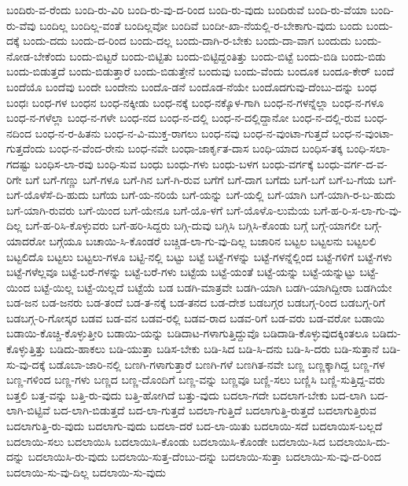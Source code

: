 ಬಂದಿರು-ವ-ರೆಂದು
ಬಂದಿ-ರು-ವಿರಿ
ಬಂದಿ-ರು-ವು-ದ-ರಿಂದ
ಬಂದಿ-ರು-ವುದು
ಬಂದಿರುವೆ
ಬಂದಿ-ರು-ವೆಯಾ
ಬಂದಿ-ರು-ವೆವು
ಬಂದಿಲ್ಲ
ಬಂದಿಲ್ಲ-ವಂತೆ
ಬಂದಿಲ್ಲವೋ
ಬಂದಿವೆ
ಬಂದೀ-ಖಾ-ನೆಯಲ್ಲಿ-ರ-ಬೇಕಾಗು-ವುದು
ಬಂದು
ಬಂದು-ದಕ್ಕೆ
ಬಂದು-ದದು
ಬಂದು-ದ-ರಿಂದ
ಬಂದು-ದಲ್ಲ
ಬಂದು-ದಾಗಿ-ರ-ಬೇಕು
ಬಂದು-ದಾ-ವಾಗ
ಬಂದುದು
ಬಂದು-ನೋಡ-ಬೇಕೆಂದು
ಬಂದು-ಬಿಟ್ಟರೆ
ಬಂದು-ಬಿಟ್ಟಿತು
ಬಂದು-ಬಿಟ್ಟಿದ್ದಂತಿತ್ತು
ಬಂದು-ಬಿಟ್ಟೆ
ಬಂದು-ಬಿಡಿ
ಬಂದು-ಬಿಡು
ಬಂದು-ಬಿಡುತ್ತದೆ
ಬಂದು-ಬಿಡುತ್ತಾರೆ
ಬಂದು-ಬಿಡುತ್ತೇನೆ
ಬಂದುವು
ಬಂದು-ವೆಂದು
ಬಂದೂಕ
ಬಂದೂ-ಕೇರ್
ಬಂದೆ
ಬಂದೆಯೊ
ಬಂದೆವು
ಬಂದೇ
ಬಂದೇನು
ಬಂದೊ-ಡನೆ
ಬಂದೊಡ-ನೆಯೇ
ಬಂದೊದಗುವು-ದೆಂಬು-ದನ್ನು
ಬಂಧ
ಬಂಧಃ
ಬಂಧ-ಗಳ
ಬಂಧನ
ಬಂಧ-ನಕ್ಕೀಡು
ಬಂಧ-ನಕ್ಕೆ
ಬಂಧ-ನಕ್ಕೊಳ-ಗಾಗಿ
ಬಂಧ-ನ-ಗಳನ್ನೆಲ್ಲಾ
ಬಂಧ-ನ-ಗಳೂ
ಬಂಧ-ನ-ಗಳೆಲ್ಲಾ
ಬಂಧ-ನ-ಗಳೇ
ಬಂಧ-ನದ
ಬಂಧ-ನ-ದಲ್ಲಿ
ಬಂಧ-ನ-ದಲ್ಲಿದ್ದಾನೋ
ಬಂಧ-ನ-ದಲ್ಲಿ-ರುವ
ಬಂಧ-ನದಿಂದ
ಬಂಧ-ನ-ರ-ಹಿತನು
ಬಂಧ-ನ-ವಿ-ಮುಕ್ತ-ರಾಗಲು
ಬಂಧ-ನವು
ಬಂಧ-ನ-ವುಂಟಾ-ಗುತ್ತದೆ
ಬಂಧ-ನ-ವುಂಟಾ-ಗುತ್ತದೆಂದು
ಬಂಧ-ನ-ವೆಂದ-ರೇನು
ಬಂಧ-ನವೇ
ಬಂಧಾ-ಜಾರ್ಕೃತ-ದಾಸ
ಬಂಧಿ-ಯಾದ
ಬಂಧಿಸ-ತಕ್ಕ
ಬಂಧಿ-ಸಲಾ-ಗದಷ್ಟು
ಬಂಧಿಸ-ಲಾ-ರವು
ಬಂಧಿ-ಸುವ
ಬಂಧು
ಬಂಧು-ಗಳು
ಬಂಧು-ಬಳಗ
ಬಂಧು-ವರ್ಗಕ್ಕೆ
ಬಂಧು-ವರ್ಗ-ದ-ವ-ರಿಗೇ
ಬಗೆ
ಬಗೆ-ಗಣ್ಣು
ಬಗೆ-ಗಳೂ
ಬಗೆ-ಗಿನ
ಬಗೆ-ಗಿ-ರುವ
ಬಗೆಗೆ
ಬಗೆ-ದಾಗ
ಬಗೆದು
ಬಗೆ-ಬಗೆ
ಬಗೆ-ಬ-ಗೆಯ
ಬಗೆ-ಬಗೆ-ಯೊಳೆಸೆ-ದಿ-ಹುದು
ಬಗೆಯ
ಬಗೆ-ಯ-ನರಿಯೆ
ಬಗೆ-ಯನ್ನು
ಬಗೆ-ಯಲ್ಲಿ
ಬಗೆ-ಯಾಗಿ
ಬಗೆ-ಯಾಗಿ-ರ-ಬ-ಹುದು
ಬಗೆ-ಯಾಗಿ-ರುವರು
ಬಗೆ-ಯಿಂದ
ಬಗೆ-ಯೇನೂ
ಬಗೆ-ಯೊ-ಳಗೆ
ಬಗೆ-ಯೊಳೊ-ಲುಮೆಯ
ಬಗೆ-ಹ-ರಿ-ಸ-ಲಾ-ಗು-ವು-ದಿಲ್ಲ
ಬಗೆ-ಹ-ರಿಸಿ-ಕೊಳ್ಳುವರು
ಬಗೆ-ಹರಿ-ಸಿದ್ದರು
ಬಗ್ಗಿ-ದುವು
ಬಗ್ಗಿಸಿ
ಬಗ್ಗಿಸಿ-ಕೊಂಡು
ಬಗ್ಗೆ
ಬಗ್ಗೆ-ಯಾಗಲೀ
ಬಗ್ಗೆ-ಯಾದರೋ
ಬಗ್ಗೆಯೂ
ಬಚಾಯಿ-ಸಿ-ಕೊಂಡರೆ
ಬಚ್ಚಿಡ-ಲಾ-ಗು-ವು-ದಿಲ್ಲ
ಬಜಾರಿನ
ಬಟ್ಟಲ
ಬಟ್ಟಲನು
ಬಟ್ಟಲಲಿ
ಬಟ್ಟಲಿದೊ
ಬಟ್ಟಲು
ಬಟ್ಟಲು-ಗಳೂ
ಬಟ್ಟಿ-ನಲ್ಲಿ
ಬಟ್ಟು
ಬಟ್ಟೆ
ಬಟ್ಟೆ-ಗಳನ್ನು
ಬಟ್ಟೆ-ಗಳನ್ನೆಲ್ಲಿಂದ
ಬಟ್ಟೆ-ಗಳಿಗೆ
ಬಟ್ಟೆ-ಗಳು
ಬಟ್ಟೆ-ಗಳೆಲ್ಲವೂ
ಬಟ್ಟೆ-ಬರೆ-ಗಳನ್ನು
ಬಟ್ಟೆ-ಬರೆ-ಗಳು
ಬಟ್ಟೆಯ
ಬಟ್ಟೆ-ಯಂತೆ
ಬಟ್ಟೆ-ಯನ್ನು
ಬಟ್ಟೆ-ಯನ್ನುಟ್ಟು
ಬಟ್ಟೆ-ಯಿಂದ
ಬಟ್ಟೆ-ಯಿಲ್ಲ
ಬಟ್ಟೆ-ಯಿಲ್ಲದೆ
ಬಟ್ಟೆಯೆ
ಬಡ
ಬಡಗಿ-ಮಾತ್ರವೇ
ಬಡಗಿ-ಯಾಗಿ
ಬಡಗಿ-ಯಾಗಿದ್ದೀರಾ
ಬಡಗಿಯೇ
ಬಡ-ಜನ
ಬಡ-ಜನರು
ಬಡ-ತಂದೆ
ಬಡ-ತ-ನಕ್ಕೆ
ಬಡ-ತನದ
ಬಡ-ದೇಶ
ಬಡಬಗ್ಗರ
ಬಡಬಗ್ಗ-ರಿಂದ
ಬಡಬಗ್ಗ-ರಿಗೆ
ಬಡಬಗ್ಗ-ರಿ-ಗೋಸ್ಕರ
ಬಡವ
ಬಡ-ವನ
ಬಡವ-ರಲ್ಲಿ
ಬಡವ-ರಾದ
ಬಡವ-ರಿಗೆ
ಬಡ-ವರು
ಬಡ-ವರೋ
ಬಡಾಯಿ
ಬಡಾಯಿ-ಕೊಚ್ಚಿ-ಕೊಳ್ಳುತ್ತೀರಿ
ಬಡಾಯಿ-ಯನ್ನು
ಬಡಿದಾಟ-ಗಳಾಗುತ್ತಿದ್ದುವೊ
ಬಡಿದಾಡಿ-ಕೊಳ್ಳುವುದಕ್ಕಿಂತಲೂ
ಬಡಿದು-ಕೊಳ್ಳುತ್ತಿತ್ತು
ಬಡಿದು-ಹಾಕಲು
ಬಡಿ-ಯುತ್ತಾ
ಬಡಿಸ-ಬೇಕು
ಬಡಿ-ಸಿದ
ಬಡಿ-ಸಿ-ದನು
ಬಡಿ-ಸಿ-ದರು
ಬಡಿ-ಸುತ್ತಾನೆ
ಬಡಿ-ಸು-ವು-ದಕ್ಕೆ
ಬಡೊಬಾ-ಜಾರಿ-ನಲ್ಲಿ
ಬಣಗಿ-ಗಳಾಗುತ್ತಾರೆ
ಬಣಗಿ-ಗಳೆ
ಬಣಗಿತ-ನವೇ
ಬಣ್ಣ
ಬಣ್ಣಕ್ಕಾಗಿದ್ದ
ಬಣ್ಣ-ಗಳ
ಬಣ್ಣ-ಗಳಿಂದ
ಬಣ್ಣ-ಗಳು
ಬಣ್ಣದ
ಬಣ್ಣ-ದೊಂದಿಗೆ
ಬಣ್ಣ-ವನ್ನು
ಬಣ್ಣವೂ
ಬಣ್ಣಿ-ಸಲು
ಬಣ್ಣಿಸಿ
ಬಣ್ಣಿ-ಸುತ್ತಿದ್ದ-ವರು
ಬತ್ತಲಿ
ಬತ್ತ-ವನ್ನು
ಬತ್ತಿ-ರು-ವುದು
ಬತ್ತಿ-ಹೋಗಿದೆ
ಬತ್ತು-ವುದು
ಬದಲಾ-ಗದೇ
ಬದಲಾಗ-ಬೇಕು
ಬದ-ಲಾಗಿ
ಬದ-ಲಾಗಿ-ಬಿಟ್ಟಿವೆ
ಬದ-ಲಾಗಿ-ಬಿಡುತ್ತದೆ
ಬದ-ಲಾ-ಗುತ್ತದೆ
ಬದಲಾ-ಗುತ್ತಿದೆ
ಬದಲಾಗುತ್ತಿ-ರುತ್ತದೆ
ಬದಲಾಗುತ್ತಿರುವ
ಬದಲಾಗುತ್ತಿ-ರು-ವುದು
ಬದಲಾಗು-ವುದು
ಬದಲಾ-ದರೆ
ಬದ-ಲಾ-ಯಿತು
ಬದಲಾಯಿ-ಸದೆ
ಬದಲಾಯಿಸ-ಬಲ್ಲದೆ
ಬದಲಾಯಿ-ಸಲು
ಬದಲಾಯಿಸಿ
ಬದಲಾಯಿಸಿ-ಕೊಂಡು
ಬದಲಾಯಿಸಿ-ಕೊಂಡೇ
ಬದಲಾಯಿ-ಸಿದ
ಬದಲಾಯಿಸಿ-ದು-ದನ್ನು
ಬದಲಾಯಿಸಿ-ರು-ವುದು
ಬದಲಾಯಿ-ಸುತ್ತ-ದೆಂಬು-ದನ್ನು
ಬದಲಾಯಿ-ಸುತ್ತಾ
ಬದಲಾಯಿ-ಸು-ವು-ದ-ರಿಂದ
ಬದಲಾಯಿ-ಸು-ವು-ದಿಲ್ಲ
ಬದಲಾಯಿ-ಸು-ವುದು
